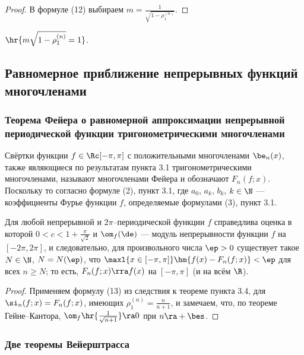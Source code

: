 \documentclass[a4paper]{article}
\begin{document}
\begin{proof}
В формуле (12) выбираем $m = \frac1{\sqrt{1 - \rho_1^{(n)}}}$.
\end{proof}

$\hr{m\sqrt{1 - \rho_1^{(n)}}=1}$.

\subsection{Равномерное приближение непрерывных функций
многочленами}

\subsubsection{Теорема Фейера о равномерной аппроксимации
непрерывной периодической функции тригонометрическими многочленами}

Свёртки функции $f\in\Rc[-\pi,\pi]$ с положительными многочленами
$\be_n(x)$, также являющиеся по результатам пункта 3.1
тригонометрическими многочленами, называют многочленами Фейера и
обозначают $F_n(f;x)$. Поскольку  то согласно формуле (2),
пункт 3.1,  где $a_0$, $a_k$, $b_k$,
$k\in\N$ --- коэффициенты Фурье функции $f$, определяемые формулами
(3), пункт 3.1.

\begin{theorem}
Для любой непрерывной и $2\pi$--периодической функции $f$
справедлива оценка  в которой $0<c<1 +
\frac{\pi}{\sqrt2}$ и $\om_f(\de)$ --- модуль непрерывности функции
$f$ на $[-2\pi,2\pi]$, и следовательно, для произвольного числа
$\ep>0$ существует такое $N\in\N$, $N=N(\ep)$, что
$\maxl{x\in[-\pi,\pi]} \hm{f(x) - F_n(f;x)} < \ep$ для всех $n\ge
N$; то есть, $F_n(f;x) \rra f(x)$ на $[-\pi,\pi]$ (и на всём $\R$).
\end{theorem}

\begin{proof}
Применяем формулу (13) из следствия к теореме пункта 3.4, для
$\si_n(f;x) = F_n(f;x)$, имеющих $\rho_1^{(n)} = \frac{n}{n+1}$, и
замечаем, что, по теореме Гейне--Кантора,
$\om_f\hr{\frac1{\sqrt{n+1}}}\ra0$ при $n\ra+\bes$.
\end{proof}

\subsubsection{Две теоремы Вейерштрасса}
\end{document}
